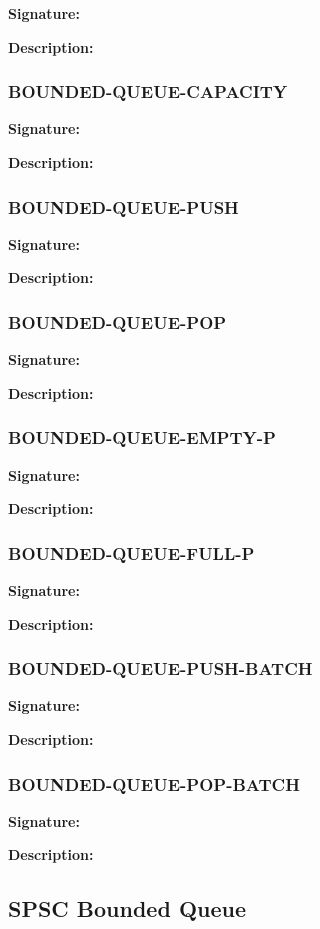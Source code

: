 \documentclass[12pt, letterpaper]{article}
\newcommand{\customitem}[2]{%
	\noindent\textbf{#1}\\[0.5ex]%
	#2\vspace{1ex}%
}
\begin{document}
	\customitem{Signature:}{}
	
	\customitem{Description:}{}
	\subsubsection{BOUNDED-QUEUE-CAPACITY}
	
	\customitem{Signature:}{}
	
	\customitem{Description:}{}
	\subsubsection{BOUNDED-QUEUE-PUSH}
	
	\customitem{Signature:}{}
	
	\customitem{Description:}{}
	\subsubsection{BOUNDED-QUEUE-POP}
	
	\customitem{Signature:}{}
	
	\customitem{Description:}{}
	\subsubsection{BOUNDED-QUEUE-EMPTY-P}
	
	\customitem{Signature:}{}
	
	\customitem{Description:}{}
	\subsubsection{BOUNDED-QUEUE-FULL-P}
	
	\customitem{Signature:}{}
	
	\customitem{Description:}{}
	\subsubsection{BOUNDED-QUEUE-PUSH-BATCH}
	
	\customitem{Signature:}{}
	
	\customitem{Description:}{}
	\subsubsection{BOUNDED-QUEUE-POP-BATCH}
	
	\customitem{Signature:}{}
	
	\customitem{Description:}{}
	
	\subsection{SPSC Bounded Queue}
\end{document}
